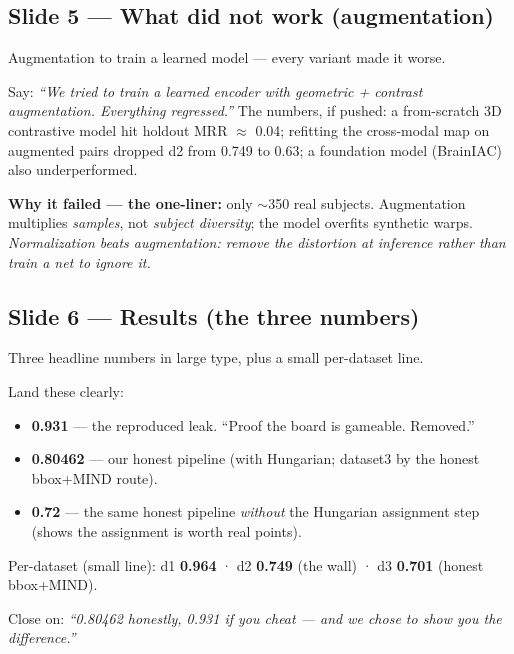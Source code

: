 \documentclass[12pt,a4paper]{article}
\begin{document}
\subsection{Slide 5 — What did not work (augmentation)}
\begin{system}
Augmentation to train a learned model — every variant made it worse.
\end{system}
Say: \emph{``We tried to train a learned encoder with geometric + contrast augmentation.
Everything regressed.''} The numbers, if pushed: a from-scratch 3D contrastive model hit
holdout MRR $\approx$ 0.04; refitting the cross-modal map on augmented pairs dropped d2
from 0.749 to 0.63; a foundation model (BrainIAC) also underperformed.
\begin{tradeoff}
\textbf{Why it failed — the one-liner:} only $\sim$350 real subjects. Augmentation
multiplies \emph{samples}, not \emph{subject diversity}; the model overfits synthetic
warps. \emph{Normalization beats augmentation: remove the distortion at inference rather
than train a net to ignore it.}
\end{tradeoff}

\subsection{Slide 6 — Results (the three numbers)}
\begin{system}
Three headline numbers in large type, plus a small per-dataset line.
\end{system}
Land these clearly:
\begin{itemize}
\item \textcolor{cTradeFr}{\textbf{0.931}} — the reproduced leak. ``Proof the board is gameable. Removed.''
\item \textcolor{cSysFr}{\textbf{0.80462}} — our honest pipeline (with Hungarian; dataset3 by the honest bbox+MIND route).
\item \textcolor{cFunFr}{\textbf{0.72}} — the same honest pipeline \emph{without} the Hungarian assignment step (shows the assignment is worth real points).
\end{itemize}
Per-dataset (small line): d1 \textbf{0.964} · d2 \textbf{0.749} (the wall) · d3 \textbf{0.701} (honest bbox+MIND).
\begin{compression}
Close on: \emph{``0.80462 honestly, 0.931 if you cheat — and we chose to show you the
difference.''}
\end{compression}

\end{document}
